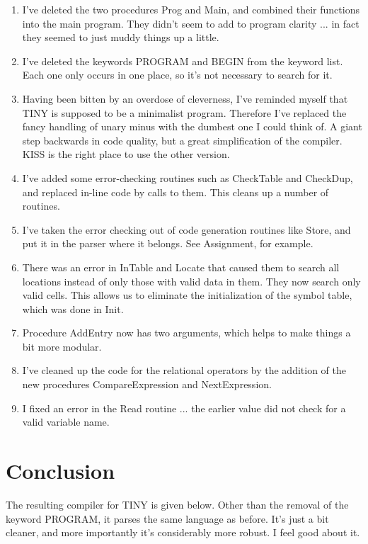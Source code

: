 \begin{enumerate}
\item	I've deleted the two procedures Prog and Main, and combined their functions into the main program. They didn't seem to add  to program clarity ... in fact  they  seemed  to  just muddy things up a little.
\item	I've  deleted  the  keywords  PROGRAM  and  BEGIN  from the keyword list. Each  one  only occurs in one place, so it's not necessary to search for it.
\item	Having been  bitten  by  an  overdose  of  cleverness, I've reminded myself that TINY  is  supposed  to be a minimalist program. Therefore I've  replaced  the  fancy  handling of unary minus with the dumbest one I could think of. A giant step backwards in code quality, but a  great simplification of the compiler. KISS is the right place to use  the other version.
\item	I've added some  error-checking routines such as CheckTable and CheckDup, and  replaced  in-line code by calls to them. This cleans up a number of routines.
\item	I've  taken  the  error  checking  out  of  code generation routines  like Store, and put it in  the  parser  where  it belongs. See Assignment, for example.
\item	There was an error in InTable and Locate  that  caused them to search all locations  instead  of  only those with valid data  in them. They now search only  valid  cells. This allows us to eliminate  the  initialization  of  the symbol table, which was done in Init.
\item	Procedure AddEntry now has two  arguments, which  helps to make things a bit more modular.
\item	I've cleaned up the  code  for  the relational operators by the addition of the  new  procedures  CompareExpression and NextExpression.
\item	I fixed an error in the Read routine ... the  earlier value did not check for a valid variable name.
\end{enumerate}

\section{Conclusion}

The resulting compiler for  TINY  is given below. Other than the removal  of  the  keyword PROGRAM, it parses the same language as before. It's  just  a  bit cleaner, and more importantly  it's considerably more robust. I feel good about it.

